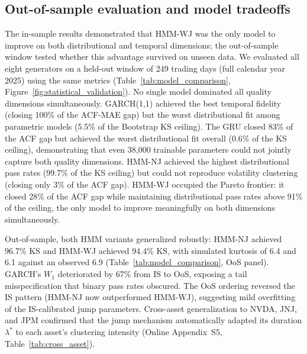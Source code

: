 \subsection{Out-of-sample evaluation and model tradeoffs}
The in-sample results demonstrated that HMM-WJ was the only model to improve on both distributional and temporal dimensions; the out-of-sample window tested whether this advantage survived on unseen data. We evaluated all eight generators on a held-out window of 249 trading days (full calendar year 2025) using the same metrics (Table~\ref{tab:model_comparison}, Figure~\ref{fig:statistical_validation}). No single model dominated all quality dimensions simultaneously. GARCH(1,1) achieved the best temporal fidelity (closing 100\% of the ACF-MAE gap) but the worst distributional fit among parametric models (5.5\% of the Bootstrap KS ceiling). The GRU closed 83\% of the ACF gap but achieved the worst distributional fit overall (0.6\% of the KS ceiling), demonstrating that even 38{,}000 trainable parameters could not jointly capture both quality dimensions. HMM-NJ achieved the highest distributional pass rates (99.7\% of the KS ceiling) but could not reproduce volatility clustering (closing only 3\% of the ACF gap). HMM-WJ occupied the Pareto frontier: it closed 28\% of the ACF gap while maintaining distributional pass rates above 91\% of the ceiling, the only model to improve meaningfully on both dimensions simultaneously.

Out-of-sample, both HMM variants generalized robustly: HMM-NJ achieved 96.7\% KS and HMM-WJ achieved 94.4\% KS, with simulated kurtosis of 6.4 and 6.1 against an observed 6.9 (Table~\ref{tab:model_comparison}, OoS panel). GARCH's $W_1$ deteriorated by 67\% from IS to OoS, exposing a tail misspecification that binary pass rates obscured. The OoS ordering reversed the IS pattern (HMM-NJ now outperformed HMM-WJ), suggesting mild overfitting of the IS-calibrated jump parameters. Cross-asset generalization to NVDA, JNJ, and JPM confirmed that the jump mechanism automatically adapted its duration $\lambda^{*}$ to each asset's clustering intensity (Online Appendix~S5, Table~\ref{tab:cross_asset}).

